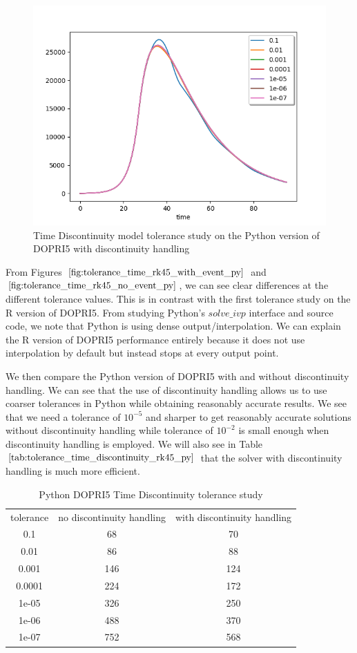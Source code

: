 \begin{figure}[h]
\centering
\includegraphics[width=0.7\linewidth]{./figures/tolerance_time_rk45_with_event_py}
\caption{Time Discontinuity model tolerance study on the Python version of DOPRI5 with discontinuity handling}
\label{fig:tolerance_time_rk45_with_event_py}
\end{figure}

From Figures $\ref{fig:tolerance_time_rk45_with_event_py}$ and $\ref{fig:tolerance_time_rk45_no_event_py}$, we can see clear differences at the different tolerance values. This is in contrast with the first tolerance study on the R version of DOPRI5. From studying Python's $solve\_ivp$ interface and source code, we note that Python is using dense output/interpolation. We can explain the R version of DOPRI5 performance entirely because it does not use interpolation by default but instead stops at every output point.

We then compare the Python version of DOPRI5 with and without discontinuity handling. We can see that the use of discontinuity handling allows us to use coarser tolerances in Python while obtaining reasonably accurate results. We see that we need a tolerance of $10^{-5}$ and sharper to get reasonably accurate solutions without discontinuity handling while tolerance of $10^{-2}$ is small enough when discontinuity handling is employed. We will also see in Table $\ref{tab:tolerance_time_discontinuity_rk45_py}$ that the solver with discontinuity handling is much more efficient.


\begin{table}[h]
\caption {Python DOPRI5 Time Discontinuity tolerance study} \label{tab:tolerance_time_discontinuity_rk45_py} 
\begin{center}
\begin{tabular}{ c c c }
tolerance & no discontinuity handling & with discontinuity handling \\ 
0.1 & 68 & 70 \\
0.01 & 86 & 88 \\
0.001 & 146 & 124 \\
0.0001& 224 & 172 \\
1e-05 & 326 & 250 \\
1e-06 & 488 & 370 \\
1e-07 & 752 & 568 \\
\end{tabular}
\end{center}
\end{table}

